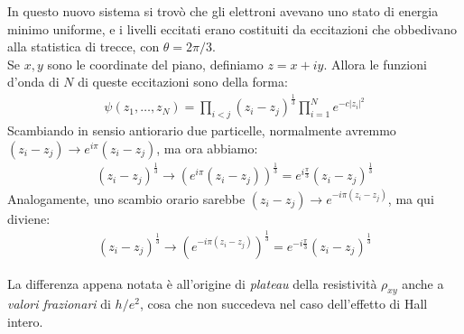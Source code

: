 \documentclass[../../FisicaTeorica.tex]{subfiles}
\begin{document}
In questo nuovo sistema si trovò che gli elettroni avevano uno stato di energia minimo uniforme, e i livelli eccitati erano costituiti da eccitazioni che obbedivano alla statistica di trecce, con $\theta=2\pi/3$.\\
Se $x,y$ sono le coordinate del piano, definiamo $z=x+iy$. Allora le funzioni d'onda di $N$ di queste eccitazioni sono della forma:
\begin{align*}
\psi(z_1, \dots, z_N) = \prod_{i<j} (z_i - z_j)^{\frac{1}{3}}\prod_{i=1}^N e^{-c|z_i|^2}
\end{align*}
Scambiando in sensio antiorario due particelle, normalmente avremmo $(z_i - z_j) \to e^{i\pi} (z_i -z_j)$, ma ora abbiamo:
\begin{align*}
(z_i-z_j)^{\frac{1}{3}} \to (e^{i\pi}(z_i-z_j))^{\frac{1}{3}} = e^{i\frac{\pi}{3}}(z_i - z_j)^{\frac{1}{3}}
\end{align*}
Analogamente, uno scambio orario sarebbe $(z_i-z_j) \to e^{-i\pi (z_i-z_j)}$, ma qui diviene:
\begin{align*}
(z_i-z_j)^{\frac{1}{3}} \to (e^{-i\pi (z_i - z_j)})^{\frac{1}{3}}= e^{-i\frac{\pi}{3}}(z_i- z_j)^{\frac{1}{3}}
\end{align*}

La differenza appena notata è all'origine di \textit{plateau} della resistività $\rho_{xy}$ anche a \textit{valori frazionari} di $h/e^2$, cosa che non succedeva nel caso dell'effetto di Hall intero.
\end{document}
